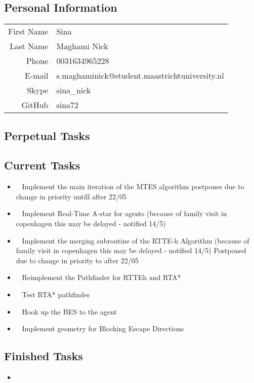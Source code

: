 \subsection{Personal Information}
\begin{table}[h!]
	\begin{tabular}{rl}
	First Name 	& Sina\\
	Last Name	& Maghami Nick\\
	Phone		& 0031634965228\\
	E-mail		& s.maghaminick@student.maastrichtuniversity.nl\\
	Skype		& sina\_nick\\
	GitHub		& sina72
\end{tabular}
\end{table}

\subsection{Perpetual Tasks}

\subsection{Current Tasks}
\begin{itemize}
	\item~
	Implement the main iteration of the MTES algorithm
		\subitem postpones due to change in priority untill after 22/05
	\item~
	Implement Real-Time A-star for agents
		\subitem (because of family visit in copenhagen this may be delayed - notified 14/5)
	\item~
	Implement the merging subroutine of the RTTE-h Algorithm
		\subitem (because of family visit in copenhagen this may be delayed - notified 14/5)
		\subitem Postponed due to change in priority to after 22/05
	\item~
		Reimplement the Pathfinder for RTTEh and RTA*
	\item~
		Test RTA* pathfinder
	\item~
		Hook up the BES to the agent
	\item~
		Implement geometry for Blocking Escape Directions
\end{itemize}
\subsection{Finished Tasks}
\begin{itemize}
	\item 
\end{itemize}
